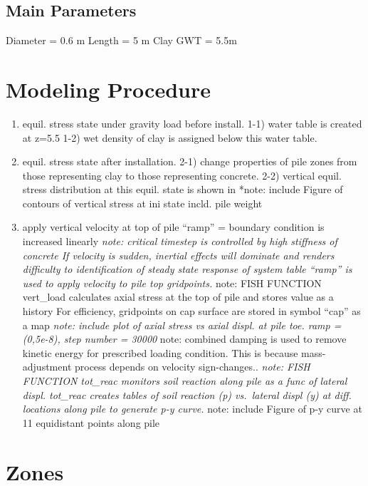 \documentclass[a4paper, nobind]{templates/ociamthesis}
\providecommand{\tightlist}{%
  \setlength{\itemsep}{0pt}\setlength{\parskip}{0pt}}
\begin{document}
\hypertarget{main-parameters}{%
\subsection{Main Parameters}\label{main-parameters}}

Diameter = 0.6 m
Length = 5 m
Clay
GWT = 5.5m

\hypertarget{modeling-procedure}{%
\section{Modeling Procedure}\label{modeling-procedure}}

\begin{enumerate}
\def\labelenumi{\arabic{enumi})}
\tightlist
\item
  equil. stress state under gravity load before install.
  1-1) water table is created at z=5.5
  1-2) wet density of clay is assigned below this water table.
\item
  equil. stress state after installation.
  2-1) change properties of pile zones from those
  representing clay to those representing concrete.
  2-2) vertical equil. stress distribution at this equil. state is shown in
  *note: include Figure of contours of vertical stress at ini state incld. pile weight
\item
  apply vertical velocity at top of pile
  ``ramp'' = boundary condition is increased linearly
  \emph{note: critical timestep is controlled by high stiffness of concrete
  If velocity is sudden, inertial effects will dominate and renders difficulty to identification of steady state response of system
  table ``ramp'' is used to apply velocity to pile top gridpoints.
  }note: FISH FUNCTION vert\_load calculates axial stress at the top of pile and stores value as a history
  For efficiency, gridpoints on cap surface are stored in symbol ``cap'' as a map
  \emph{note: include plot of axial stress vs axial displ. at pile toe. ramp = (0,5e-8), step number = 30000
  }note: combined damping is used to remove kinetic energy for prescribed loading condition. This is because mass-adjustment process depends on velocity sign-changes..
  \emph{note: FISH FUNCTION tot\_reac monitors soil reaction along pile as a func of lateral displ. tot\_reac creates tables of soil reaction (p) vs.~lateral displ (y) at diff. locations along pile to generate p-y curve.
  }note: include Figure of p-y curve at 11 equidistant points along pile
\end{enumerate}

\hypertarget{zones-2}{%
\section{Zones}\label{zones-2}}
\end{document}
